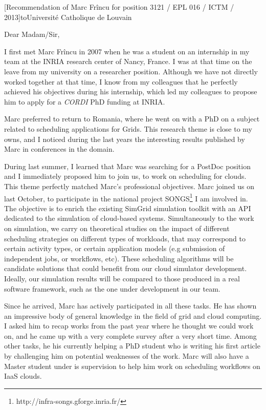 \documentclass[a4paper,10pt]{article}
\begin{document}

\begin{letter}[Recommendation of Marc Fr\^incu for position 3121 / EPL 016 / ICTM / 2013]{to}{Universit\'e Catholique de Louvain}

Dear Madam/Sir, 

I first met Marc  Fr\^incu in 2007 when he was a student  on an internship in my
team at the  INRIA research center of Nancy,  France. I was at that  time on the
leave from my university on a researcher position. Although we have not directly
worked  together at  that time,  I  know from  my colleagues  that he  perfectly
achieved  his objectives  during  his  internship, which  led  my colleagues  to
propose him to apply for a \emph{CORDI} PhD funding at INRIA.

Marc preferred to  return to Romania, where he  went on with a PhD  on a subject
related to scheduling applications for Grids. This research theme is close to my
owns, and I  noticed during the last years the  interesting results published by
Marc in conferences in the domain.

During last summer, I learned that Marc was searching for a PostDoc position and
I immediately proposed  him to join us,  to work on scheduling  for clouds. This
theme perfectly matched  Marc's professional objectives. Marc joined  us on last
October,       to      participate       in      the       national      project
SONGS\footnote{http://infra-songs.gforge.inria.fr/}  I  am   involved  in.   The
objective  is to  enrich the  existing SimGrid  simulation toolkit  with an  API
dedicated to the  simulation of cloud-based systems. Simultaneously  to the work
on  simulation, we  carry  on theoretical  studies on  the  impact of  different
scheduling strategies  on different types  of workloads, that may  correspond to
certain  activity  types,  or  certain application  models  (e.g  submission  of
independent  jobs, or  workflows,  etc).  These  scheduling  algorithms will  be
candidate solutions  that could  benefit from  our cloud  simulator development.
Ideally, our  simulation results will  be compared to  those produced in  a real
software framework, such as the one under development in our team.

Since he  arrived, Marc has  actively participated in  all these tasks.   He has
shown an  impressive body of  general knowledge in the  field of grid  and cloud
computing. I  asked him to recap  works from the  past year where he  thought we
could work  on, and he came  up with a very  complete survey after a  very short
time. Among other tasks,  he his currently helping a PhD  student who is writing
his first article  by challenging him on potential weaknesses  of the work. Marc
will  also have  a Master  student  under is  supervision  to help  him work  on
scheduling workflows on IaaS clouds.


\end{letter}
\end{document}

